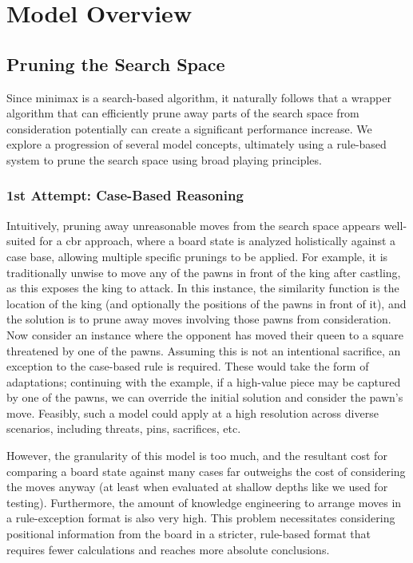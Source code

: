 \documentclass[letterpaper]{article}
\begin{document}
\section{Model Overview}

\subsection{Pruning the Search Space}
Since minimax is a search-based algorithm, it naturally follows that a wrapper algorithm that can efficiently prune away parts of the search space from consideration potentially can create a significant performance increase.  We explore a progression of several model concepts, ultimately using a rule-based system to prune the search space using broad playing principles.

\subsubsection{1st Attempt: Case-Based Reasoning}
Intuitively, pruning away unreasonable moves from the search space appears well-suited for a \acrshort{cbr} approach, where a board state is analyzed holistically against a case base, allowing multiple specific prunings to be applied.  For example, it is traditionally unwise to move any of the pawns in front of the king after castling, as this exposes the king to attack.  In this instance, the similarity function is the location of the king (and optionally the positions of the pawns in front of it), and the solution is to prune away moves involving those pawns from consideration.  Now consider an instance where the opponent has moved their queen to a square threatened by one of the pawns.  Assuming this is not an intentional sacrifice, an exception to the case-based rule is required.  These would take the form of adaptations; continuing with the example, if a high-value piece may be captured by one of the pawns, we can override the initial solution and consider the pawn's move.  Feasibly, such a model could apply at a high resolution across diverse scenarios, including threats, pins, sacrifices, etc.

However, the granularity of this model is too much, and the resultant cost for comparing a board state against many cases far outweighs the cost of considering the moves anyway (at least when evaluated at shallow depths like we used for testing).  Furthermore, the amount of knowledge engineering to arrange moves in a rule-exception format is also very high.  This problem necessitates considering positional information from the board in a stricter, rule-based format that requires fewer calculations and reaches more absolute conclusions.
\end{document}

